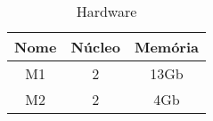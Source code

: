 \begin{table}[h!]
  \centering
  \begin{tabular}{|c|c|c|}
      \hline
    Nome & \textbf{Núcleo} & \textbf{Memória}\\
      \hline
    M1 & 2 & 13Gb \\
      \hline
    M2 & 2 & 4Gb \\
      \hline
   \end{tabular}

  \caption{Hardware}
  \label{tab:machines}
\end{table}

